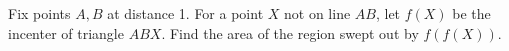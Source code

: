 Fix points $ A,B $ at distance 1. For a point $ X $ not on line $ AB $, let $ f(X)$ be the incenter of triangle $ ABX $. Find the area of the region swept out by $ f(f(X))$.
